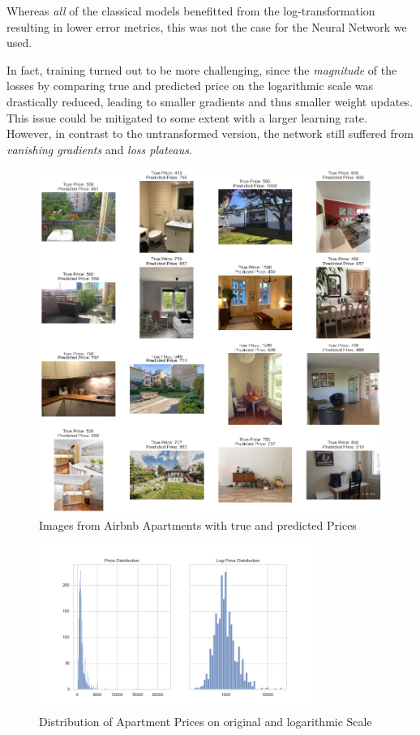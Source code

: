 \documentclass[12pt, letterpaper]{article}
\begin{document}
Whereas \emph{all} of the classical models benefitted from the log-transformation resulting in lower error metrics, this was not the case for the Neural Network we used.

In fact, training turned out to be more challenging, since the \emph{magnitude} of the losses by comparing true and predicted price on the logarithmic scale was drastically reduced, leading to smaller gradients and thus smaller weight updates.
This issue could be mitigated to some extent with a larger learning rate.
However, in contrast to the untransformed version, the network still suffered from \emph{vanishing gradients} and \emph{loss plateaus}.



\newpage




\appendix

\begin{figure}[t]
    \centering
    \includegraphics[width=\textwidth]{cnn_examples.png}
    \caption{Images from Airbnb Apartments with true and predicted Prices}
    \label{fig:cnn-examples}
\end{figure}

\begin{figure}[t]
    \centering
    \includegraphics[width=0.8\textwidth]{price_distribution.png}
    \caption{Distribution of Apartment Prices on original and logarithmic Scale}
    \label{fig:price-distribution}
\end{figure}
\end{document}
